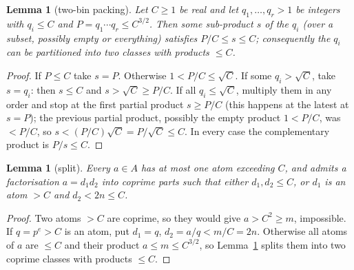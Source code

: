 \documentclass[11pt]{article}
\newtheorem{lemma}[theorem]{Lemma}
\theoremstyle{definition}
\begin{document}
\begin{lemma}[two-bin packing]\label{lem:pack}
Let $C\ge1$ be real and let $q_1,\dots,q_r>1$ be integers with $q_i\le C$ and $P=q_1\cdots q_r\le C^{3/2}$.
Then some sub-product $s$ of the $q_i$ (over a subset, possibly empty or everything) satisfies
$P/C\le s\le C$; consequently the $q_i$ can be partitioned into two classes with products $\le C$.
\end{lemma}
\begin{proof}
If $P\le C$ take $s=P$. Otherwise $1<P/C\le\sqrt C$. If some $q_i>\sqrt C$, take $s=q_i$: then $s\le C$ and
$s>\sqrt C\ge P/C$. If all $q_i\le\sqrt C$, multiply them in any order and stop at the first partial product
$s\ge P/C$ (this happens at the latest at $s=P$); the previous partial product, possibly the empty product
$1<P/C$, was $<P/C$, so $s<(P/C)\sqrt C=P/\sqrt C\le C$. In every case the
complementary product is $P/s\le C$.
\end{proof}

\begin{lemma}[split]\label{lem:split}
Every $a\in A$ has at most one atom exceeding $C$, and admits a factorisation $a=d_1d_2$ into coprime parts
such that either $d_1,d_2\le C$, or $d_1$ is an atom $>C$ and $d_2<2n\le C$.
\end{lemma}
\begin{proof}
Two atoms $>C$ are coprime, so they would give $a>C^2\ge m$, impossible. If $q=p^e>C$ is an atom, put
$d_1=q$, $d_2=a/q<m/C=2n$. Otherwise all atoms of $a$ are $\le C$ and their product $a\le m\le C^{3/2}$, so
Lemma~\ref{lem:pack} splits them into two coprime classes with products $\le C$.
\end{proof}
\end{document}
